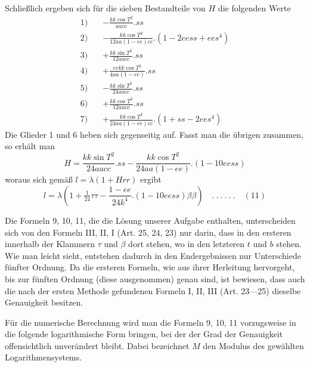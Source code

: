 %
Schließlich ergeben sich für die sieben Bestandteile von \(H\) die folgenden Werte
\[
\begin{aligned}
1)\quad&-\frac{kk\cos T^2}{aacc}\mathord{.}ss\\
2)\quad&-\frac{kk\cos T^2}{12aa(1-ee)cc}\mathord{.}(1-2eess+ees^4)\\
3)\quad&+\frac{kk\sin T^2}{12aacc}\mathord{.}ss\\
4)\quad&+\frac{eekk\cos T^2}{4aa(1-ee)}\mathord{.}ss\\
5)\quad&-\frac{kk\sin T^2}{24aacc}\mathord{.}ss\\
6)\quad&+\frac{kk\cos T^2}{12aacc}\mathord{.}ss\\
7)\quad&+\frac{kk\cos T^2}{24aa(1-ee)cc}\mathord{.}(1+ss-2ees^4)
\end{aligned}
\]
Die Glieder 1 und 6 heben sich gegenseitig auf. Fasst man die übrigen zusammen, so erhält man
\[
H=\frac{kk\sin T^2}{24aacc}\mathord{.}ss-\frac{kk\cos T^2}{24aa(1-ee)}\mathord{.}(1-10eess)
\]
woraus sich gemäß \(l=\lambda(1+Hrr)\) ergibt
\[
l=\lambda(1+\tfrac1{24}\tau\tau-\frac{1-ee}{24k^4}\mathord{.}(1-10eess)\beta\beta)\quad .\ .\ .\ .\ .\ .\quad(11)
\]

Die Formeln 9, 10, 11, die die Lösung unserer Aufgabe enthalten, unterscheiden sich von den Formeln III, II, I (Art. 25, 24, 23) nur darin, dass in den ersteren innerhalb der Klammern \(\tau\) und \(\beta\) dort stehen, wo in den letzteren \(t\) und \(b\) stehen. Wie man leicht sieht, entstehen dadurch in den Endergebnissen nur Unterschiede fünfter Ordnung. Da die ersteren Formeln, wie aus ihrer Herleitung hervorgeht, bis zur fünften Ordnung (diese ausgenommen) genau sind, ist bewiesen, dass auch die nach der ersten Methode gefundenen Formeln I, II, III (Art. 23---25) dieselbe Genauigkeit besitzen.

Für die numerische Berechnung wird man die Formeln 9, 10, 11 vorzugsweise in die folgende logarithmische Form bringen, bei der der Grad der Genauigkeit offensichtlich unverändert bleibt. Dabei bezeichnet \(M\) den Modulus des gewählten Logarithmensystems.
